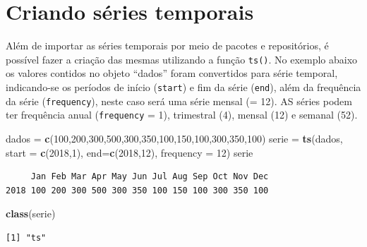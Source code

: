 \documentclass[12pt,brazil,oneside]{book}
\newenvironment{Shaded}{\begin{snugshade}}{\end{snugshade}}
\newcommand{\DataTypeTok}[1]{\textcolor[rgb]{0.13,0.29,0.53}{#1}}
\newcommand{\DecValTok}[1]{\textcolor[rgb]{0.00,0.00,0.81}{#1}}
\newcommand{\KeywordTok}[1]{\textcolor[rgb]{0.13,0.29,0.53}{\textbf{#1}}}
\newcommand{\NormalTok}[1]{#1}
\newcommand{\StringTok}[1]{\textcolor[rgb]{0.31,0.60,0.02}{#1}}
\begin{document}
\hypertarget{criando-series-temporais}{%
\section{Criando séries temporais}\label{criando-series-temporais}}

Além de importar as séries temporais por meio de pacotes e repositórios, é possível fazer a criação das mesmas utilizando a função \texttt{ts()}. No exemplo abaixo os valores contidos no objeto ``dados'' foram convertidos para série temporal, indicando-se os períodos de início (\texttt{start}) e fim da série (\texttt{end}), além da frequência da série (\texttt{frequency}), neste caso será uma série mensal (= 12). AS séries podem ter frequência anual (\texttt{frequency} = 1), trimestral (4), mensal (12) e semanal (52).

\begin{Shaded}
\begin{Highlighting}[]
\NormalTok{dados =}\StringTok{ }\KeywordTok{c}\NormalTok{(}\DecValTok{100}\NormalTok{,}\DecValTok{200}\NormalTok{,}\DecValTok{300}\NormalTok{,}\DecValTok{500}\NormalTok{,}\DecValTok{300}\NormalTok{,}\DecValTok{350}\NormalTok{,}\DecValTok{100}\NormalTok{,}\DecValTok{150}\NormalTok{,}\DecValTok{100}\NormalTok{,}\DecValTok{300}\NormalTok{,}\DecValTok{350}\NormalTok{,}\DecValTok{100}\NormalTok{)}
\NormalTok{serie =}\StringTok{ }\KeywordTok{ts}\NormalTok{(dados, }\DataTypeTok{start =} \KeywordTok{c}\NormalTok{(}\DecValTok{2018}\NormalTok{,}\DecValTok{1}\NormalTok{), }\DataTypeTok{end=}\KeywordTok{c}\NormalTok{(}\DecValTok{2018}\NormalTok{,}\DecValTok{12}\NormalTok{), }\DataTypeTok{frequency =} \DecValTok{12}\NormalTok{)}
\NormalTok{serie}
\end{Highlighting}
\end{Shaded}

\begin{verbatim}
     Jan Feb Mar Apr May Jun Jul Aug Sep Oct Nov Dec
2018 100 200 300 500 300 350 100 150 100 300 350 100
\end{verbatim}

\begin{Shaded}
\begin{Highlighting}[]
\KeywordTok{class}\NormalTok{(serie)}
\end{Highlighting}
\end{Shaded}

\begin{verbatim}
[1] "ts"
\end{verbatim}
\end{document}
